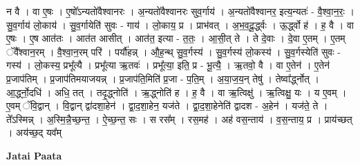 \documentclass[17pt]{extarticle}
\begin{document}
न वै । वा ए॒षः । ए॒षो᳚ऽन्यतो॑वैश्वानरः । अ॒न्यतो॑वैश्वानरः सुव॒र्गाय॑ । अ॒न्यतो॑वैश्वानर॒ इत्य॒न्यतः॑ - वै॒श्वा॒न॒रः॒ । सु॒व॒र्गाय॑ लो॒काय॑ । सु॒व॒र्गायेति॑ सुवः - गाय॑ । लो॒काय॒ प्र । प्राभ॑वत् । अ॒भ॒व॒दू॒र्द्ध्वः । ऊ॒र्द्ध्वो ह॑ । ह॒ वै । वा ए॒षः । ए॒ष आत॑तः । आत॑त आसीत् । आत॑त॒ इत्या - त॒तः॒ । आ॒सी॒त् ते । ते दे॒वाः । दे॒वा ए॒तम् । ए॒तम् ॅवै᳚श्वान॒रम् । वै॒श्वा॒न॒रम् परि॑ । पर्यौ॑हन्न् । औ॒ह॒न्थ् सु॒व॒र्गस्य॑ । सु॒व॒र्गस्य॑ लो॒कस्य॑ । सु॒व॒र्गस्येति॑ सुवः - गस्य॑ । लो॒कस्य॒ प्रभू᳚त्यै । प्रभू᳚त्या ऋ॒तवः॑ । प्रभू᳚त्या॒ इति॒ प्र - भू॒त्यै॒ । ऋ॒तवो॒ वै । वा ए॒तेन॑ । ए॒तेन॑ प्र॒जाप॑तिम् । प्र॒जाप॑तिमयाजयन्न् । प्र॒जाप॑ति॒मिति॑ प्र॒जा - प॒ति॒म् । अ॒या॒ज॒य॒न् तेषु॑ । 
तेष्वा᳚र्द्ध्नोत् । आ॒र्द्ध्नो॒दधि॑ । अधि॒ तत् । तदृ॒द्ध्नोति॑ । ऋ॒द्ध्नोति॑ ह । ह॒ वै । वा ऋ॒त्विक्षु॑ । ऋ॒त्विक्षु॒ यः । य ए॒वम् । ए॒वम् ॅवि॒द्वान् । वि॒द्वान् द्वा॑दशा॒हेन॑ । द्वा॒द॒शा॒हेन॒ यज॑ते । द्वा॒द॒शा॒हेनेति॑ द्वादश - अ॒हेन॑ । यज॑ते॒ ते । ते᳚ऽस्मिन्न् । अ॒स्मि॒न्नै॒च्छ॒न्त॒ । ऐ॒च्छ॒न्त॒ सः । स रस᳚म् । रस॒मह॑ । अह॑ वस॒न्ताय॑ । व॒स॒न्ताय॒ प्र । प्राय॑च्छत् । अय॑च्छ॒द् यव᳚म् \newline

\textbf{Jatai Paata} \newline
\end{document}
